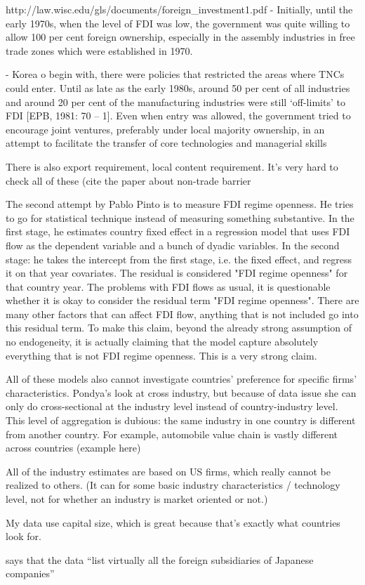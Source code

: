 http://law.wisc.edu/gls/documents/foreign_investment1.pdf
- Initially, until the early 1970s, when the level of FDI was low, the
government was quite willing to allow 100 per cent foreign ownership, especially
in the assembly industries in free trade zones which were established in 1970.

- Korea o begin with, there were policies that restricted the areas where TNCs could
enter. Until as late as the early 1980s, around 50 per cent of all industries and
around 20 per cent of the manufacturing industries were still ‘off-limits’ to FDI
[EPB,  1981:  70 – 1].  Even  when  entry  was  allowed,  the  government  tried  to
encourage  joint  ventures,  preferably  under  local  majority  ownership,  in  an
attempt to facilitate the transfer of core technologies and managerial skills

There is also export requirement, local content requirement. It's very hard to check all of these (cite the paper about non-trade barrier \citep{Grieco2000)} \citep{Hufbauer2013}

The second attempt by Pablo Pinto is to measure FDI regime openness. He tries to go for statistical technique instead of measuring something substantive. In the first stage, he estimates country fixed effect in a regression model that uses FDI flow as the dependent variable and a bunch of dyadic variables. In the second stage: he takes the intercept from the first stage, i.e. the fixed effect, and regress it on that year covariates. The residual is considered "FDI regime openness" for that country year. The problems with FDI flows as usual, it is questionable whether it is okay to consider the residual term "FDI regime openness". There are many other factors that can affect FDI flow, anything that is not included go into this residual term. To make this claim, beyond the already strong assumption of no endogeneity, it is actually claiming that the model capture absolutely everything that is not FDI regime openness. This is a very strong claim.

All of these models also cannot investigate countries' preference for specific firms' characteristics. Pondya's look at cross industry, but because of data issue she can only do cross-sectional at the industry level instead of country-industry level. This level of aggregation is dubious: the same industry in one country is different from another country. For example, automobile value chain is vastly different across countries (example here)

All of the industry estimates are based on US firms, which really cannot be realized to others. (It can for some basic industry characteristics / technology level, not for whether an industry is market oriented or not.)

My data use capital size, which is great because that's exactly what countries look for. 


\citep[295]{Yamawaki1991} says that the data ``list virtually all the foreign subsidiaries of Japanese companies''
